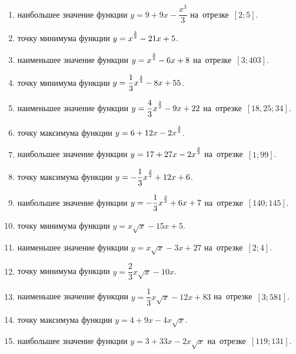 \documentclass[a4paper,10pt]{article}
\begin{document}
\begin{enumerate}
\item {} наибольшее значение функции $y=9 +9x-\dfrac{x^3}{3}$ на~отрезке~$\left[2;5\right]$.

\item {} точку минимума функции $y=x\strut^{\frac{3}{2}} -21x+5$.

\item {} наименьшее значение функции $y=x\strut^{\frac{3}{2}} -6x+8$ на~отрезке~$\left[3;403\right]$.

\item {} точку минимума функции $y=\dfrac{1}{3}x\strut^{\frac{3}{2}} -8x+55$.

\item {} наименьшее значение функции $y=\dfrac{4}{3}x\strut^{\frac{3}{2}} -9x+22$ на~отрезке~$\left[18,25;34\right]$.

\item {} точку максимума функции $y=6+12x-2x\strut^{\frac{3}{2}}$.

\item {} наибольшее значение функции $y=17+27x-2x\strut^{\frac{3}{2}}$ на~отрезке~$\left[1;99\right]$.

\item {} точку максимума функции $y=-\dfrac{1}{3}x\strut^{\frac{3}{2}} +12x+6$.

\item {} наибольшее значение функции $y=-\dfrac{1}{3}x\strut^{\frac{3}{2}} +6x+7$ на~отрезке~$\left[140;145\right]$.

\item {} точку минимума функции $y=x\sqrt{x} -15x+5$.

\item {} наименьшее значение функции $y=x\sqrt{x} -3x+27$ на~отрезке~$\left[2;4\right]$.

\item {} точку минимума функции $y=\dfrac{2}{3}x\sqrt{x} -10x$.

\item {} наименьшее значение функции $y=\dfrac{1}{3}x\sqrt{x} -12x+83$ на~отрезке~$\left[3;581\right]$.

\item {} точку максимума функции $y=4+9x -4x\sqrt{x}$.

\item {} наибольшее значение функции $y=3+33x -2x\sqrt{x}$ на~отрезке~$\left[119;131\right]$.


\end{enumerate}
\end{document}
